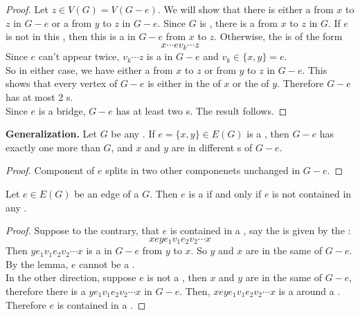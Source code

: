 \documentclass[english, 11pt]{article}
\begin{document}
\begin{proof}
  Let $z \in V(G) = V(G - e)$. We will show that there is either a  from $x$ to $z$ in $G - e$ or a  from $y$ to $z$ in $G - e$. Since $G$ is , there is a  from $x$ to $z$ in $G$. If $e$ is not in this , then this is a  in $G - e$ from $x$ to $z$. Otherwise, the  is of the form
  \[ x\cdots ev_k \cdots z \]
  Since $e$ can't appear twice, $v_k\cdots z$ is a  in $G-e$ and $v_k \in \{x, y\} = e$. \\
  So in either case, we have either a  from $x$ to $z$ or from $y$ to $z$ in $G - e$. This shows that every vertex of $G - e$ is either in the  of $x$ or the  of $y$. Therefore $G - e$ has at most 2 s. \\
  Since $e$ is a bridge, $G - e$ has at least two s. The result follows.
\end{proof}

\textbf{Generalization.} Let $G$ be any . If $e = \{x,y\} \in E(G)$ is a , then $G - e$ has exactly one more  than $G$, and $x$ and $y$ are in different s of $G - e$.

\begin{proof}
  Component of $e$ splits in two other componenets unchanged in $G -e$.
\end{proof}

\begin{thrm}
  Let $e \in E(G)$ be an edge of a  $G$. Then $e$ is a  if and only if $e$ is not contained in any .
\end{thrm}

\begin{proof}
  Suppose to the contrary, that $e$ is contained in a , say the  is given by the :
  \[ xeye_1 v_1e_2v_2\cdots x \]
  Then $ye_1v_1e_2v_2 \cdots x$ is a  in $G - e$ from $y$ to $x$. So $y$ and $x$ are in the same  of $G -e$. By the lemma, $e$ cannot be a . \\

  In the other direction, suppose $e$ is not a , then $x$ and $y$ are in the same  of $G - e$, therefore there is a  $ye_1v_1e_2v_2 \cdots x$ in $G - e$. Then, $xeye_1v_1e_2v_2 \cdots x$ is a  around a . Therefore $e$ is contained in a .
\end{proof}
\end{document}
